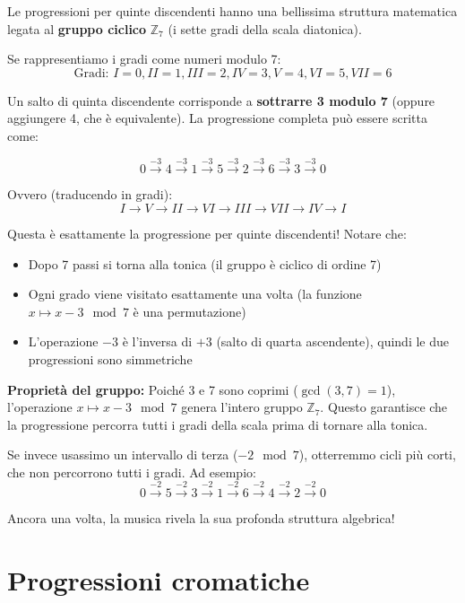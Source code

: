 \begin{matematica}
	Le progressioni per quinte discendenti hanno una bellissima struttura matematica legata al \textbf{gruppo ciclico} $\mathbb{Z}_7$ (i sette gradi della scala diatonica).
	
	Se rappresentiamo i gradi come numeri modulo 7:
	\[
	\text{Gradi: } I=0, II=1, III=2, IV=3, V=4, VI=5, VII=6
	\]
	
	Un salto di quinta discendente corrisponde a \textbf{sottrarre 3 modulo 7} (oppure aggiungere 4, che è equivalente). La progressione completa può essere scritta come:
	
	\[
	0 \xrightarrow{-3} 4 \xrightarrow{-3} 1 \xrightarrow{-3} 5 \xrightarrow{-3} 2 \xrightarrow{-3} 6 \xrightarrow{-3} 3 \xrightarrow{-3} 0
	\]
	
	Ovvero (traducendo in gradi):
	\[
	I \rightarrow V \rightarrow II \rightarrow VI \rightarrow III \rightarrow VII \rightarrow IV \rightarrow I
	\]
	
	Questa è esattamente la progressione per quinte discendenti! Notare che:
	\begin{itemize}
		\item Dopo 7 passi si torna alla tonica (il gruppo è ciclico di ordine 7)
		\item Ogni grado viene visitato esattamente una volta (la funzione $x \mapsto x-3 \mod 7$ è una permutazione)
		\item L'operazione $-3$ è l'inversa di $+3$ (salto di quarta ascendente), quindi le due progressioni sono simmetriche
	\end{itemize}
	
	\textbf{Proprietà del gruppo:} Poiché 3 e 7 sono coprimi ($\gcd(3,7) = 1$), l'operazione $x \mapsto x-3 \mod 7$ genera l'intero gruppo $\mathbb{Z}_7$. Questo garantisce che la progressione percorra tutti i gradi della scala prima di tornare alla tonica.
	
	Se invece usassimo un intervallo di terza ($-2 \mod 7$), otterremmo cicli più corti, che non percorrono tutti i gradi. Ad esempio:
	\[
	0 \xrightarrow{-2} 5 \xrightarrow{-2} 3 \xrightarrow{-2} 1 \xrightarrow{-2} 6 \xrightarrow{-2} 4 \xrightarrow{-2} 2 \xrightarrow{-2} 0
	\]
	
	Ancora una volta, la musica rivela la sua profonda struttura algebrica!
\end{matematica}

\section{Progressioni cromatiche}
\label{sec:progressioni_cromatiche}

